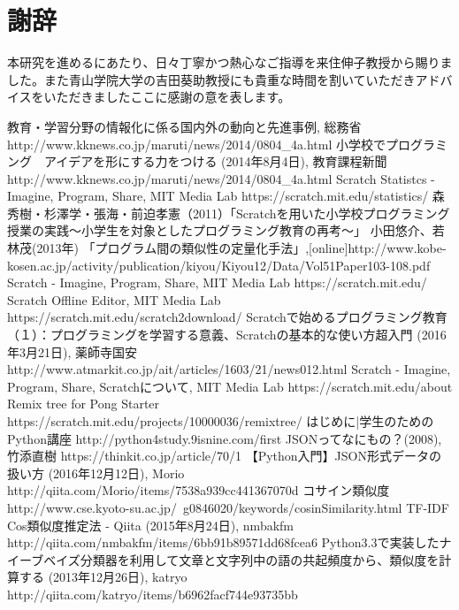 \documentclass[a4paper,10pt,onecolumn,oneside,openany]{jsbook}
\begin{document}
\chapter{謝辞}
本研究を進めるにあたり、日々丁寧かつ熱心なご指導を来住伸子教授から賜りました。また青山学院大学の吉田葵助教授にも貴重な時間を割いていただきアドバイスをいただきましたここに感謝の意を表します。

\begin{thebibliography}{30}

教育・学習分野の情報化に係る国内外の動向と先進事例, 総務省 http://www.kknews.co.jp/maruti/news/2014/0804\_4a.html
小学校でプログラミング　アイデアを形にする力をつける (2014年8月4日), 教育課程新聞 http://www.kknews.co.jp/maruti/news/2014/0804\_4a.html
Scratch Statistcs - Imagine, Program, Share, MIT Media Lab https://scratch.mit.edu/statistics/
森秀樹・杉澤学・張海・前迫孝憲（2011）「Scratchを用いた小学校プログラミング授業の実践〜小学生を対象としたプログラミング教育の再考〜」
小田悠介、若林茂(2013年) 「プログラム間の類似性の定量化手法」,[online]http://www.kobe-kosen.ac.jp/activity/publication/kiyou/Kiyou12/Data/Vol51Paper103-108.pdf
Scratch - Imagine, Program, Share, MIT Media Lab https://scratch.mit.edu/
Scratch Offline Editor, MIT Media Lab https://scratch.mit.edu/scratch2download/
Scratchで始めるプログラミング教育（１）：プログラミングを学習する意義、Scratchの基本的な使い方超入門 (2016年3月21日), 薬師寺国安 http://www.atmarkit.co.jp/ait/articles/1603/21/news012.html
Scratch - Imagine, Program, Share, Scratchについて, MIT Media Lab https://scratch.mit.edu/about
Remix tree for Pong Starter https://scratch.mit.edu/projects/10000036/remixtree/
はじめに|学生のためのPython講座 http://python4study.9isnine.com/first
JSONってなにもの？(2008), 竹添直樹 https://thinkit.co.jp/article/70/1
【Python入門】JSON形式データの扱い方 (2016年12月12日), Morio http://qiita.com/Morio/items/7538a939cc441367070d
 コサイン類似度 http://www.cse.kyoto-su.ac.jp/~g0846020/keywords/cosinSimilarity.html
 TF-IDF Cos類似度推定法 - Qiita (2015年8月24日), nmbakfm http://qiita.com/nmbakfm/items/6bb91b89571dd68fcea6
 Python3.3で実装したナイーブベイズ分類器を利用して文章と文字列中の語の共起頻度から、類似度を計算する (2013年12月26日), katryo http://qiita.com/katryo/items/b6962facf744e93735bb

\end{thebibliography}
\end{document}

